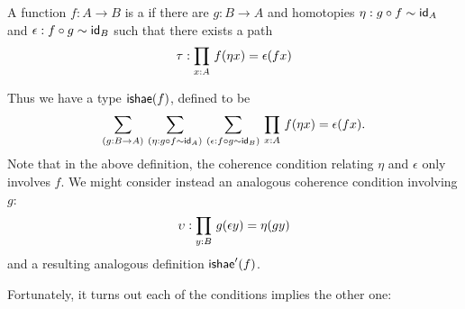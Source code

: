 \begin{defn}\label{defn:ishae}
  A function $f:A\to B$ is a  if there are $g:B\to A$ and homotopies $\eta: g \circ f \sim \idfunc[A]$ and $\epsilon:f \circ g \sim \idfunc[B]$ such that there exists a path
  \[\tau : \prd{x:A} \map{f}{\eta x} = \epsilon(fx)\]
\end{defn}

Thus we have a type $\ishae(f)$, defined to be
\begin{equation*}
  \sm{g:B\to A}{\eta: g \circ f \sim \idfunc[A]}{\epsilon:f \circ g \sim \idfunc[B]} \prd{x:A} \map{f}{\eta x} = \epsilon(fx).
\end{equation*}
Note that in the above definition, the coherence condition relating $\eta$ and $\epsilon$ only involves $f$.
We might consider instead an analogous coherence condition involving $g$:
\[\upsilon : \prd{y:B} \map{g}{\epsilon y} = \eta(gy)\]
and a resulting analogous definition $\ishae'(f)$.

Fortunately, it turns out each of the conditions implies the other one:

